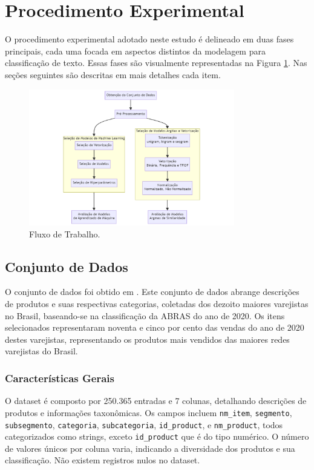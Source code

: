 \section{Procedimento Experimental}

O procedimento experimental adotado neste estudo é delineado em duas fases principais, cada uma focada em aspectos distintos da modelagem para classificação de texto. Essas fases são visualmente representadas na Figura \ref{fig:workpipeline}.  Nas seções seguintes são descritas em mais detalhes cada item.

\begin{figure}[H]
    \centering
    \includegraphics[width=0.8\textwidth]{images/fluxo.png}
    \caption{Fluxo de Trabalho.}
    \label{fig:workpipeline}
\end{figure}

\subsection{Conjunto de Dados}

O conjunto de dados foi obtido em \cite{dataset_2022}. Este conjunto de dados abrange descrições de produtos e suas respectivas categorias, coletadas dos dezoito maiores varejistas no Brasil, baseando-se na classificação da ABRAS do ano de 2020. Os itens selecionados representaram noventa e cinco por cento das vendas do ano de 2020 destes varejistas, representando os produtos mais vendidos das maiores redes varejistas do Brasil.

\subsubsection{Características Gerais}
O dataset é composto por 250.365 entradas e 7 colunas, detalhando descrições de produtos e informações taxonômicas. Os campos incluem \texttt{nm\_item}, \texttt{segmento}, \texttt{subsegmento}, \texttt{categoria}, \texttt{subcategoria}, \texttt{id\_product}, e \texttt{nm\_product}, todos categorizados como strings, exceto \texttt{id\_product} que é do tipo numérico. O número de valores únicos por coluna varia, indicando a diversidade dos produtos e sua classificação. Não existem registros nulos no dataset.

